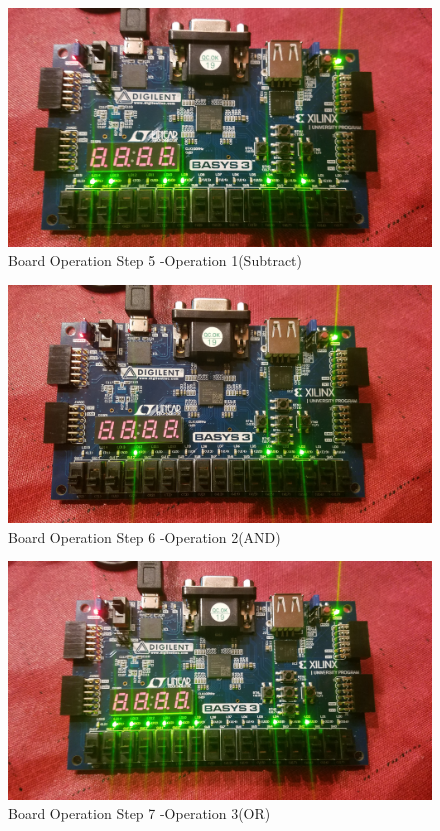\documentclass[11pt]{article}
\begin{document}
\begin{figure}[ht]\centering
	\includegraphics[width=1.0\textwidth,trim=0 0mm 0 0,clip]{Op1}
	\caption{Board Operation Step 5 -Operation 1(Subtract)}
\end{figure}

\begin{figure}[ht]\centering
	\includegraphics[width=1.0\textwidth,trim=0 0mm 0 0,clip]{Op2}
	\caption{Board Operation Step 6 -Operation 2(AND)}
\end{figure}

\begin{figure}[ht]\centering
	\includegraphics[width=1.0\textwidth,trim=0 0mm 0 0,clip]{Op3}
	\caption{Board Operation Step 7 -Operation 3(OR)}
\end{figure}
\end{document}
